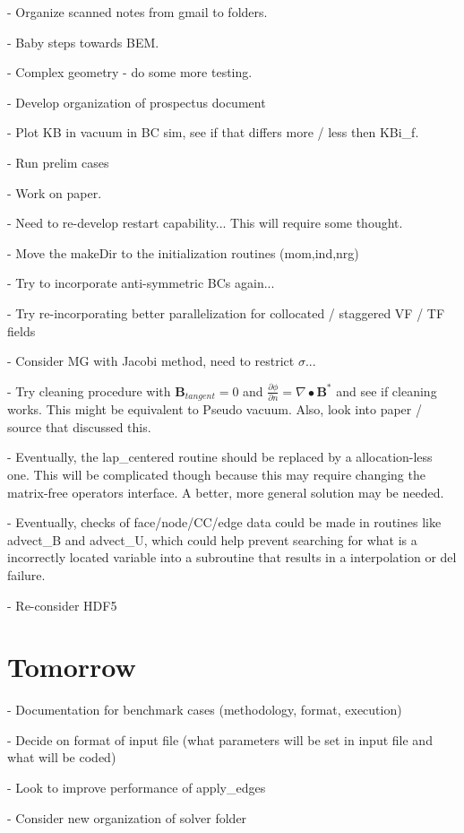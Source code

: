 \documentclass[11pt]{article}
\begin{document}
- Organize scanned notes from gmail to folders.

- Baby steps towards BEM.

- Complex geometry - do some more testing.

- Develop organization of prospectus document

- Plot KB in vacuum in BC sim, see if that differs more / less then KBi\_f.

- Run prelim cases

- Work on paper.

- Need to re-develop restart capability... This will require some thought.

- Move the makeDir to the initialization routines (mom,ind,nrg)

- Try to incorporate anti-symmetric BCs again...

- Try re-incorporating better parallelization for collocated / staggered VF / TF fields

- Consider MG with Jacobi method, need to restrict $\sigma$...

- Try cleaning procedure with $\mathbf{B}_{tangent}=0$ and $\frac{\partial \phi}{\partial n} = \nabla \bullet \mathbf{B}^*$ and see if cleaning works. This might be equivalent to Pseudo vacuum. Also, look into paper / source that discussed this.


- Eventually, the lap\_centered routine should be replaced by a allocation-less one. This will be complicated though because this may require changing the matrix-free operators interface. A better, more general solution may be needed.

- Eventually, checks of face/node/CC/edge data could be made in routines like advect\_B and advect\_U, which could help prevent searching for what is a incorrectly located variable into a subroutine that results in a interpolation or del failure.

- Re-consider HDF5

\section{Tomorrow}

- Documentation for benchmark cases (methodology, format, execution)

- Decide on format of input file (what parameters will be set in input file and what will be coded)

- Look to improve performance of apply\_edges

- Consider new organization of solver folder
\end{document}
